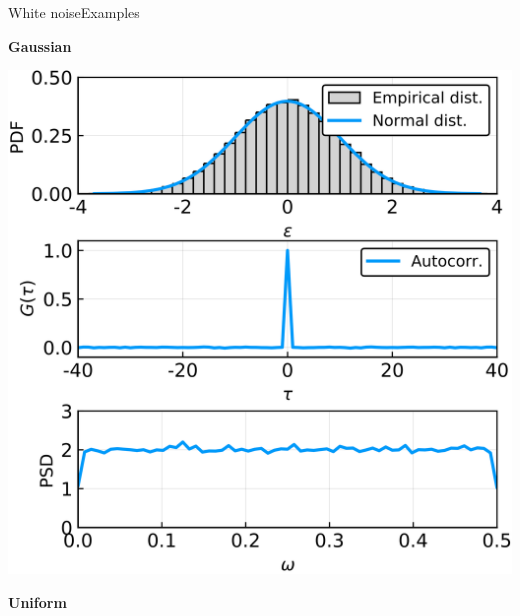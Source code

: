 \documentclass[usenames,dvipsnames,svgnames,10pt,aspectratio=169]{beamer}
\begin{document}
\begin{frame}[t, c]{White noise}{Examples}
	\begin{minipage}{.32\textwidth}
		\centering

		\textbf{Gaussian}

		\bigskip

		\includegraphics[width=\textwidth]{gaussian_white_noise_total}
	\end{minipage}%
	\hfill
	\begin{minipage}{.32\textwidth}
		\centering

		\textbf{Uniform}

		\bigskip


\end{minipage}
\end{frame}
\end{document}
